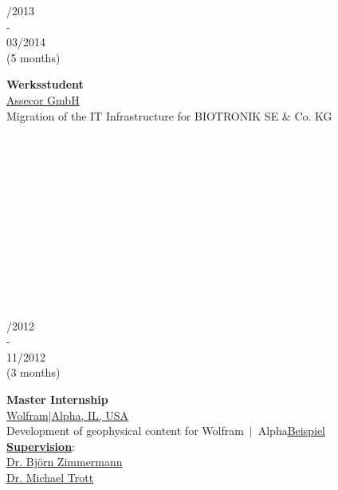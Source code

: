 \documentclass{article}
\begin{document}
\begin{minipage}[t]{0.69\textwidth}
\begin{minipage}{0.49\textwidth}
		\vspace{0.5cm}
		
		\begin{minipage}[t]{0.25\textwidth}
		/2013\\ -\\ 03/2014 \\(5 months)
		\end{minipage}
		\hfill
		\begin{minipage}[t]{0.75\textwidth}
		\textbf{Werksstudent}\\
		\href{https://assecor.de/}{\color{pblue}Assecor GmbH}\\
	     Migration of the IT Infrastructure for BIOTRONIK SE \& Co. KG
		\end{minipage}
		\\\\\\\\\\\\\\\\\\\\\
		\end{minipage}	
		\hfill
		\vrule	
		\hfill
		\begin{minipage}{0.49\textwidth}
		\begin{minipage}[t]{0.25\textwidth}
		/2012\\ -\\ 11/2012 \\(3 months)
		\end{minipage}		
		\hfill
		\begin{minipage}[t]{0.75\textwidth}
		\textbf{Master Internship}\\
		\href{https:///www.wolframalpha.com/}{\color{pblue}Wolfram$\mid$Alpha, IL, USA}\\
	   Development of geophysical content for Wolfram$~\mid~$Alpha\hfill \href{https://m.wolframalpha.com/input/?i=moment+magnitude}{\color{pblue}Beispiel}\\
	    \textbf{\underline{Supervision}}:\\ \href{mailto:bjornz@wolfram.com }{Dr. Björn Zimmermann} \\ \href{mailto:mtrott@wolfram.com }{Dr. Michael Trott} 
		\end{minipage}
		

\end{minipage}
\end{minipage}
\end{document}
